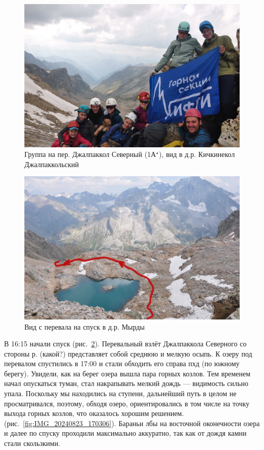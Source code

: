 \begin{figure}[h!]	
	\centering
	\includegraphics[angle=0, width=0.7\linewidth]{../pics/DSC_0069}
	\caption{Группа на пер. Джалпаккол Северный (1А$^\star$), вид в д.р. Кичкинекол Джалпаккольский}
	\label{fig:DSC_0069}
\end{figure}

\begin{figure}[h!]	
	\centering
	\includegraphics[angle=0, width=0.7\linewidth]{../pics/DSC_0041}
	\caption{Вид с перевала на спуск в д.р. Мырды}
	\label{fig:DSC_0041}
\end{figure}

В 16:15 начали спуск (рис.~\ref{fig:DSC_0041}). Перевальный взлёт Джалпаккола Северного со стороны р. \alert{(какой?)} представляет собой среднюю и мелкую осыпь. К озеру под перевалом спустились в 17:00 и стали обходить его справа пхд (по южному берегу). Увидели, как на берег озера вышла пара горных козлов. Тем временем начал опускаться туман, стал накрапывать мелкий дождь --- видимость сильно упала. Поскольку мы находились на ступени, дальнейший путь в целом не просматривался, поэтому, обходя озеро, ориентировались в том числе на точку выхода горных козлов, что оказалось хорошим решением. (рис.~\ref{fig:IMG_20240823_170306}). Бараньи лбы на восточной оконечности озера и далее по спуску проходили максимально аккуратно, так как от дождя камни стали скользкими. 
 
